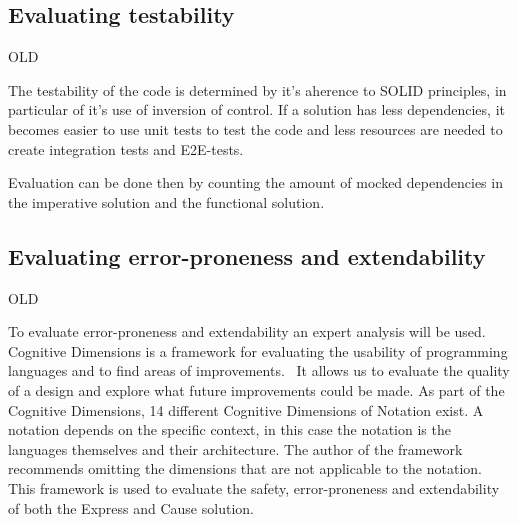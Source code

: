 


\subsection{Evaluating testability}

OLD

The testability of the code is determined by it's aherence to SOLID principles,
in particular of it's use of inversion of control. If a solution has less
dependencies, it becomes easier to use unit tests to test the code and less
resources are needed to create integration tests and E2E-tests.

Evaluation can be done then by counting the amount of mocked dependencies in the
imperative solution and the functional solution.

\subsection{Evaluating error-proneness and extendability}

OLD

To evaluate error-proneness and extendability an expert analysis will be used.
Cognitive Dimensions is a framework for evaluating the usability of programming
languages and to find areas of improvements.~\cite{GREEN1996131} It allows us to
evaluate the quality of a design and explore what future improvements could be
made. As part of the Cognitive Dimensions, 14 different Cognitive Dimensions of
Notation exist. A notation depends on the specific context, in this case the
notation is the languages themselves and their architecture. The author of the
framework recommends omitting the dimensions that are not applicable to the
notation. This framework is used to evaluate the safety, error-proneness and
extendability of both the Express and Cause solution.


